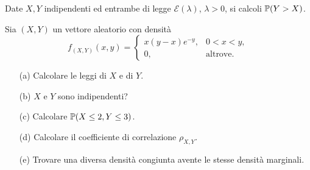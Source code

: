 
\newcommand{\RR}{\mathbb{R}}
\newcommand{\fXYxy}{f_{(X,Y)}(x,y)}
\newcommand{\fXY}{f_{(X,Y)}}
\newcommand{\SESOLOSE}{\ \Longleftrightarrow\ } %
\newcommand{\SE}{\ \Longrightarrow\ } %
\newcommand{\NNN}{\mathcal{N}}
\newcommand{\AAA}{\mathcal{A}}
\newcommand{\EEE}{\mathcal{E}}
\newcommand{\GGG}{\mathcal{G}}
\newcommand{\PPP}{\mathcal{P}}
\newcommand{\UUU}{\mathcal{U}}
\newcommand{\NN}{\mathbb{N}}
\newcommand{\indep}{\mathrel{\text{\scalebox{1.07}{$\perp\mkern-10mu\perp$}}}}
\newcommand{\Bc}{\mathcal{B}}
\newcommand{\CC}{\mathbb C}
\newcommand{\dP}{\text{ d}\mathbb{P}}
\newcommand{\Lu}{\mathcal{L}^1}
\newcommand{\QQ}{\mathbb Q}
\newcommand{\Cz}{\mathcal{C}^0}
\newcommand{\Cu}{\mathcal{C}^1}
\newcommand{\SDP}{(\Omega,\AAA,\PP)}
\newcommand{\SDE}{(E,\EEE)}
\newcommand{\SDF}{(F,\FFF)}
\newcommand{\dx}{\text{ d}x}
\newcommand{\dy}{\text{ d}y}
\newcommand{\dxy}{\text{ d}x\text{d}y}
\newcommand{\dt}{\text{ d}t}
\newcommand{\ds}{\text{ d}s}
\newcommand{\dz}{\text{ d}z}
\newcommand{\dw}{\text{ d}w}
\newcommand{\du}{\text{ d}u}
\newcommand{\dv}{\text{ d}v}
\newcommand{\inta}{\int_{a}^{b}}
\newcommand{\intaa}{\int_{c}^{d}}
\newcommand{\intb}{\int_{-\infty}^{+\infty}}
\newcommand{\intc}{\int_{0}^{+\infty}}
\newcommand{\intd}{\int_{0}^{1}}
\newcommand{\inte}{\int_{\mathbb{R}}}
\newcommand{\intf}{\int_{\mathbb{R}^2}}

\ParteEsercizi

\Esercizio{}

\Esercizio{}

\Esercizio{}
Date $X,Y$ indipendenti ed entrambe di legge $\mathcal{E}(\lambda)$, $\lambda>0$, si calcoli $\mathbb{P}(Y>X)$.

\Esercizio{}
Sia $(X,Y)$ un vettore aleatorio con densità
\begin{equation*}
f_{(X,Y)}(x,y)=\begin{cases} x(y-x)e^{-y},&0<x<y, \\ 0,&\text{altrove}.\end{cases}
\end{equation*}
\begin{enumerate}
\item [(a)] Calcolare le leggi di $X$ e di $Y$.
\item [(b)] $X$ e $Y$ sono indipendenti?
\item [(c)] Calcolare $\mathbb{P}(X\leq 2,Y\leq 3)$.
\item [(d)] Calcolare il coefficiente di correlazione $\rho_{X,Y}$.
\item [(e)] Trovare una diversa densità congiunta avente le stesse densità marginali.
\end{enumerate}


